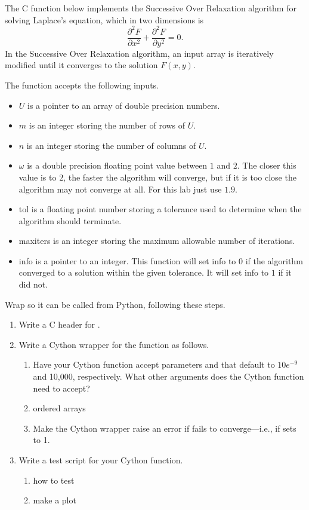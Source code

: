 The C function  below implements the Successive Over Relaxation algorithm for solving Laplace's equation, which in two dimensions is
\[
\frac{\partial^2 F}{\partial x^2} + \frac{\partial^2 F}{\partial y^2} = 0.
\]
In the Successive Over Relaxation algorithm, an input array is iteratively modified until it converges to the solution $F(x,y)$.



The function  accepts the following inputs.
\begin{itemize}
\item $U$ is a pointer to an array of double precision numbers.
\item $m$ is an integer storing the number of rows of $U$.
\item $n$ is an integer storing the number of columns of $U$.
\item $\omega$ is a double precision floating point value between $1$ and $2$.
The closer this value is to $2$, the faster the algorithm will converge, but if it is too close the algorithm may not converge at all.
For this lab just use $1.9$.
\item tol is a floating point number storing a tolerance used to determine when the algorithm should terminate.
\item maxiters is an integer storing the maximum allowable number of iterations.
\item info is a pointer to an integer.
This function will set info to $0$ if the algorithm converged to a solution within the given tolerance.
It will set info to $1$ if it did not.
\end{itemize}



\begin{problem}
Wrap  so it can be called from Python, following these steps.
\begin{enumerate}
\item Write a C header for .
\item Write a Cython wrapper for the function  as follows.
    \begin{enumerate}
    \item Have your Cython function accept parameters  and  that default to $10e^{-9}$ and 10,000, respectively.
    What other arguments does the Cython function need to accept?
    \item ordered arrays
    \item Make the Cython wrapper raise an error if  fails to converge---i.e., if  sets  to 1.
    \end{enumerate}
\item Write a test script for your Cython function.
    \begin{enumerate}
    \item how to test
    \item make a plot
    \end{enumerate}
\end{enumerate}
\end{problem}

